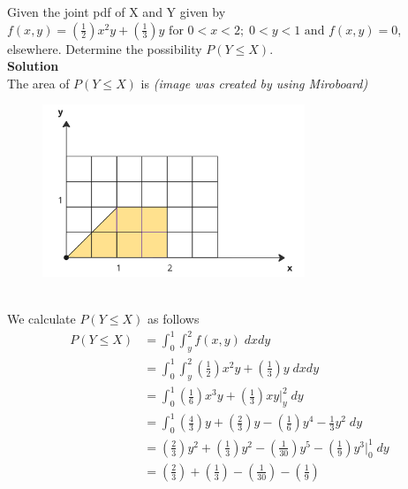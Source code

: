 \documentclass{uofa-eng-assignment}
\begin{document}
\begin{enumerate}
        Given the joint pdf of X and Y given by
        $f(x, y) = (\frac{1}{2})x^2y + (\frac{1}{3})y \text{ for } 0<x<2;\; 0<y<1 \text{ and } f(x, y) = 0$,
        elsewhere. Determine the possibility $P(Y\leq X)$. \\
        \textbf{Solution} \\
        The area of $P(Y \leq X)$ is \textit{(image was created by using Miroboard)}
        \begin{figure}[h]
            \centering
            \includegraphics[width=0.7\textwidth]{q7}
        \end{figure} \\
        We calculate $P(Y \leq X)$ as follows
        \begin{align*}
            P(Y \leq X) & = \int_{0}^{1} \int_{y}^{2} f(x, y)\; dx dy                                                                                              \\
                        & = \int_{0}^{1} \int_{y}^{2} \left(\frac{1}{2}\right)x^2y + \left(\frac{1}{3}\right)y\; dx dy                                             \\
                        & = \int_{0}^{1} \left(\frac{1}{6}\right)x^3y + \left(\frac{1}{3}\right)xy \Big|_y^2\; dy                                                  \\
                        & = \int_{0}^{1} \left(\frac{4}{3}\right)y + \left(\frac{2}{3}\right)y - \left(\frac{1}{6}\right)y^4 - \frac{1}{3}y^2\; dy                 \\
                        & = \left(\frac{2}{3}\right)y^2 + \left(\frac{1}{3}\right)y^2 - \left(\frac{1}{30}\right)y^5 - \left(\frac{1}{9}\right)y^3 \Big|_0^1 \; dy \\
                        & = \left(\frac{2}{3}\right) + \left(\frac{1}{3}\right) - \left(\frac{1}{30}\right) - \left(\frac{1}{9}\right)                             \\

\end{align*}
\end{enumerate}
\end{document}
